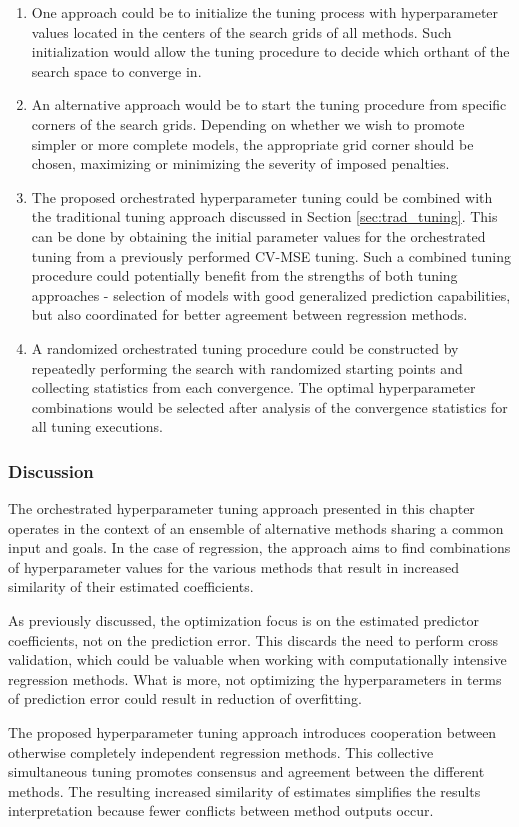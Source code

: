\begin{enumerate}
\item One approach could be to initialize the tuning process with hyperparameter values located in the centers of the search grids of all methods. Such initialization would allow the tuning procedure to decide which orthant of the search space to converge in. 
\item An alternative approach would be to start the tuning procedure from specific corners of the search grids. Depending on whether we wish to promote simpler or more complete models, the appropriate grid corner should be chosen, maximizing or minimizing the severity of imposed penalties.
\item The proposed orchestrated hyperparameter tuning could be combined with the traditional tuning approach discussed in Section \ref{sec:trad_tuning}. This can be done by obtaining the initial parameter values for the orchestrated tuning from a previously performed CV-MSE tuning. Such a combined tuning procedure could potentially benefit from the strengths of both tuning approaches - selection of models with good generalized prediction capabilities, but also coordinated for better agreement between regression methods.
\item A randomized orchestrated tuning procedure could be constructed by repeatedly performing the search with randomized starting points and collecting statistics from each convergence. The optimal hyperparameter combinations would be selected after analysis of the convergence statistics for all tuning executions.
\end{enumerate}

\subsubsection{Discussion}
The orchestrated hyperparameter tuning approach presented in this chapter operates in the context of an ensemble of alternative methods sharing a common input and goals. In the case of regression, the approach aims to find combinations of hyperparameter values for the various methods that result in increased similarity of their estimated coefficients.

As previously discussed, the optimization focus is on the estimated predictor coefficients, not on the prediction error. This discards the need to perform cross validation, which could be valuable when working with computationally intensive regression methods. What is more, not optimizing the hyperparameters in terms of prediction error could result in reduction of overfitting.

The proposed hyperparameter tuning approach introduces cooperation between otherwise completely independent regression methods. This collective simultaneous tuning promotes consensus and agreement between the different methods. The resulting increased similarity of estimates simplifies the results interpretation because fewer conflicts between method outputs occur. 
